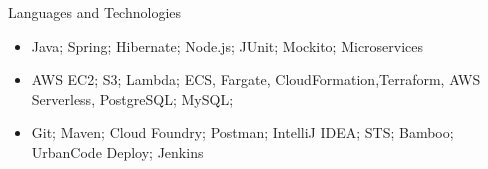 \documentclass[]{mcdowellcv}
\begin{document}
    \makeheader

    \begin{cvsection}{Languages and Technologies}
        \begin{cvsubsection}{}{}{}
            \begin{itemize}
                \item Java; Spring; Hibernate; Node.js; JUnit; Mockito; Microservices
                \item  AWS EC2; S3; Lambda; ECS, Fargate, CloudFormation,Terraform, AWS Serverless, PostgreSQL; MySQL;
                \item Git; Maven; Cloud Foundry; Postman; IntelliJ IDEA; STS; Bamboo; UrbanCode Deploy; Jenkins
            \end{itemize}
        \end{cvsubsection}
    \end{cvsection}
\end{document}
